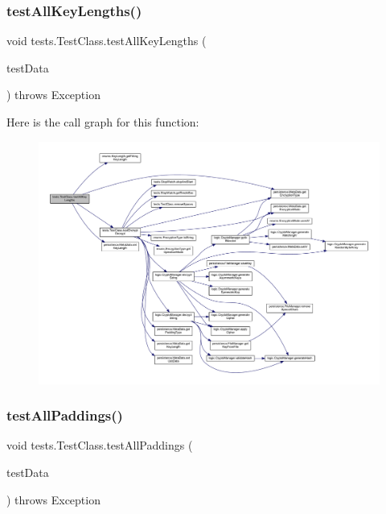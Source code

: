 \subsubsection{\texorpdfstring{test\+All\+Key\+Lengths()}{testAllKeyLengths()}}
{\footnotesize\ttfamily void tests.\+Test\+Class.\+test\+All\+Key\+Lengths (\begin{DoxyParamCaption}\item[{\mbox{\hyperlink{classpersistence_1_1_meta_data}{Meta\+Data}}}]{test\+Data }\end{DoxyParamCaption}) throws Exception\hspace{0.3cm}{\ttfamily [private]}}

Here is the call graph for this function\+:\nopagebreak
\begin{figure}[H]
\begin{center}
\leavevmode
\includegraphics[width=350pt]{classtests_1_1_test_class_a8bf4e8d943fa1d61fbaa615dcefeca69_cgraph}
\end{center}
\end{figure}
\mbox{\label{classtests_1_1_test_class_ad9f19e80ff161cfedfbfe4ba527c0074}} 
\subsubsection{\texorpdfstring{test\+All\+Paddings()}{testAllPaddings()}}
{\footnotesize\ttfamily void tests.\+Test\+Class.\+test\+All\+Paddings (\begin{DoxyParamCaption}\item[{\mbox{\hyperlink{classpersistence_1_1_meta_data}{Meta\+Data}}}]{test\+Data }\end{DoxyParamCaption}) throws Exception\hspace{0.3cm}{\ttfamily [private]}}

